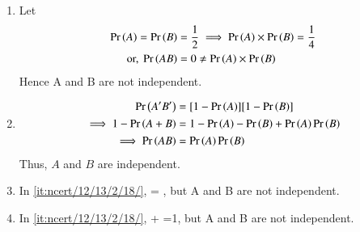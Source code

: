 \begin{enumerate}
 \item Let 
\label{it:ncert/12/13/2/18/}
 \begin{align}
 \Pr\left(A\right) = \Pr\left(B\right) &= \frac{1}{2}
 \implies \Pr\left(A\right)\times\Pr\left(B\right) = \frac{1}{4}\\
	 \text{or, }  \Pr\left(AB\right) &= 0 \neq \Pr\left(A\right)\times\Pr\left(B\right)
 \end{align}
  Hence A and B are not independent.
  \item  
\begin{align}
 \Pr\left(A^\prime B^\prime\right)&=[1-\Pr\left(A\right)] [1-\Pr\left(B\right)]
 \\
  \implies 1 - \Pr\left(A + B\right)&= 1 - \Pr\left(A\right) - \Pr\left(B\right) + \Pr\left(A\right)\Pr\left(B\right)\\
  \implies \Pr\left(AB\right) &=  \Pr\left(A\right)\Pr\left(B\right)
 \end{align}
Thus, $A$ and $B$ are independent. 
  \item In \ref{it:ncert/12/13/2/18/},  = , but A and B are not independent.
  \item In \ref{it:ncert/12/13/2/18/},  + =1, but A and B are not independent.
  \end{enumerate}

